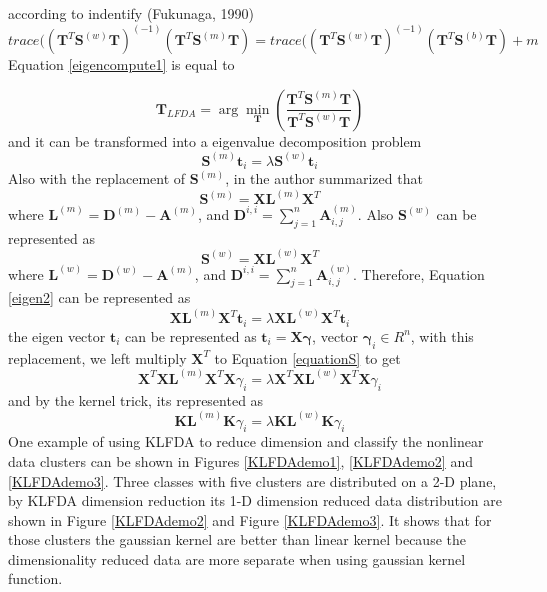 \noindent according to indentify (Fukunaga, 1990)
\begin{equation}
trace((\bm{T}^T\bm{S}^{(w)}\bm{T})^{(-1)}(\bm{T}^T\bm{S}^{(m)}\bm{T}) = trace((\bm{T}^T\bm{S}^{(w)}\bm{T})^{(-1)}(\bm{T}^T\bm{S}^{(b)}\bm{T}) + m
\end{equation}
Equation \ref{eigencompute1} is equal to 

\begin{equation}
\bm{T}_{LFDA}  = \arg\min_{\bm{T}} (\frac{\bm{T}^T\bm{S}^{(m)}\bm{T}}{\bm{T}^T\bm{S}^{(w)}\bm{T}})
\end{equation}
and it can be transformed into a eigenvalue decomposition problem 
\begin{equation}\label{eigen2}
\bm{S}^{(m)}\bm{t}_i  = \lambda \bm{S}^{(w)}\bm{t}_i
\end{equation}
Also with the replacement of $\bm{S}^{(m)}$, in \cite{KLFDA} the author summarized that 
\begin{equation}
\bm{S}^{(m)} = \bm{X}\bm{L}^{(m)}\bm{X}^T
\end{equation}
where $\bm{L}^{(m)}  = \bm{D}^{(m)} - \bm{A}^{(m)}$, and $ \bm{D}^{i,i} = \sum_{j=1}^n  \bm{A}_{i,j}^{(m)}$. Also $\bm{S}^{(w)}$ can be represented as 
\begin{equation}
\bm{S}^{(w)} = \bm{X}\bm{L}^{(w)}\bm{X}^T
\end{equation}
where $\bm{L}^{(w)}  = \bm{D}^{(w)} - \bm{A}^{(m)}$, and $ \bm{D}^{i,i} = \sum_{j=1}^n  \bm{A}_{i,j}^{(w)}$. 
Therefore, Equation \ref{eigen2} can be represented as
\begin{equation}\label{equationS}
\bm{X}\bm{L}^{(m)}\bm{X}^T \bm{t}_i= \lambda\bm{X}\bm{L}^{(w)}\bm{X}^T \bm{t}_i
\end{equation}
the eigen vector $\bm{t}_i$  can be represented as $\bm{t}_i = \bm{X}\bm{\gamma}$, vector $\bm{\gamma}_i \in R^n$, with this replacement, we left multiply $\bm{X}^T$ to Equation \ref{equationS} to get 
\begin{equation}
\bm{X}^T\bm{X}\bm{L}^{(m)}\bm{X}^T\bm{X}\gamma_i = \lambda\bm{X}^T\bm{X}\bm{L}^{(w)}\bm{X}^T \bm{X}\gamma_i
\end{equation}
and by the kernel trick, its represented as
\begin{equation}
\bm{K}\bm{L}^{(m)}\bm{K}\gamma_i  = \lambda \bm{K}\bm{L}^{(w)}\bm{K}\gamma_i
\end{equation}
One example of using KLFDA to reduce dimension and classify the nonlinear data clusters can be shown in Figures \ref{KLFDAdemo1}, \ref{KLFDAdemo2} and \ref{KLFDAdemo3}. Three classes with five clusters are distributed on a 2-D plane, by KLFDA dimension reduction its 1-D dimension reduced data distribution are shown in Figure \ref{KLFDAdemo2} and Figure \ref{KLFDAdemo3}. It shows that for those clusters the gaussian kernel are better than linear kernel because the dimensionality reduced data are more separate when using gaussian kernel function.

